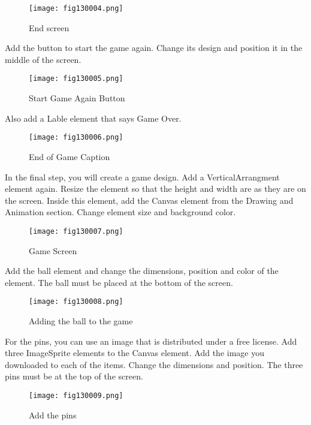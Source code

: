 \begin{figure}[H]
   \centering
   \texttt{[image: fig130004.png]}
   \caption{End screen}
\label{fig130004}
\end{figure}

Add the button to start the game again. Change its design and position it in the middle of the screen.

\begin{figure}[H]
   \centering
   \texttt{[image: fig130005.png]}
   \caption{Start Game Again Button}
\label{fig130005}
\end{figure}

Also add a Lable element that says Game Over.

\begin{figure}[H]
   \centering
   \texttt{[image: fig130006.png]}
   \caption{End of Game Caption}
\label{fig130006}
\end{figure}

In the final step, you will create a game design. Add a VerticalArrangment element again. Resize the element so that the height and width are as they are on the screen. Inside this element, add the Canvas element from the Drawing and Animation section. Change element size and background color.

\begin{figure}[H]
   \centering
   \texttt{[image: fig130007.png]}
   \caption{Game Screen}
\label{fig130007}
\end{figure}

Add the ball element and change the dimensions, position and color of the element. The ball must be placed at the bottom of the screen.

\begin{figure}[H]
   \centering
   \texttt{[image: fig130008.png]}
   \caption{Adding the ball to the game}
\label{fig130008}
\end{figure}

For the pins, you can use an image that is distributed under a free license. Add three ImageSprite elements to the Canvas element. Add the image you downloaded to each of the items. Change the dimensions and position. The three pins must be at the top of the screen.

\begin{figure}[H]
   \centering
   \texttt{[image: fig130009.png]}
   \caption{Add the pins}
\label{fig130009}
\end{figure}

